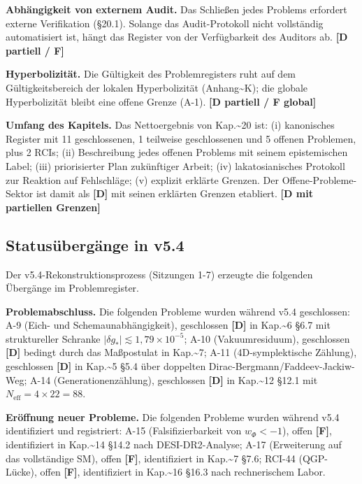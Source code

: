 ﻿\documentclass[11pt,letterpaper]{article}
\begin{document}
\textbf{Abhängigkeit von externem Audit.} Das Schließen jedes Problems erfordert externe Verifikation (§20.1). Solange das Audit-Protokoll nicht vollständig automatisiert ist, hängt das Register von der Verfügbarkeit des Auditors ab. \textbf{[D partiell / F]}

\textbf{Hyperbolizität.} Die Gültigkeit des Problemregisters ruht auf dem Gültigkeitsbereich der lokalen Hyperbolizität (Anhang\textasciitilde{}K); die globale Hyperbolizität bleibt eine offene Grenze (A-1). \textbf{[D partiell / F global]}

\textbf{Umfang des Kapitels.} Das Nettoergebnis von Kap.\textasciitilde{}20 ist: (i) kanonisches Register mit 11 geschlossenen, 1 teilweise geschlossenen und 5 offenen Problemen, plus 2 RCIs; (ii) Beschreibung jedes offenen Problems mit seinem epistemischen Label; (iii) priorisierter Plan zukünftiger Arbeit; (iv) lakatosianisches Protokoll zur Reaktion auf Fehlschläge; (v) explizit erklärte Grenzen. Der Offene-Probleme-Sektor ist damit als \textbf{[D]} mit seinen erklärten Grenzen etabliert. \textbf{[D mit partiellen Grenzen]}
\subsection{Statusübergänge in v5.4}
Der v5.4-Rekonstruktionsprozess (Sitzungen 1-7) erzeugte die folgenden Übergänge im Problemregister.

\textbf{Problemabschluss.} Die folgenden Probleme wurden während v5.4 geschlossen: A-9 (Eich- und Schemaunabhängigkeit), geschlossen \textbf{[D]} in Kap.\textasciitilde{}6 §6.7 mit struktureller Schranke $|\delta g_*| \lesssim 1{,}79 \times 10^{-5}$; A-10 (Vakuumresiduum), geschlossen \textbf{[D]} bedingt durch das Maßpostulat in Kap.\textasciitilde{}7; A-11 (4D-symplektische Zählung), geschlossen \textbf{[D]} in Kap.\textasciitilde{}5 §5.4 über doppelten Dirac-Bergmann/Faddeev-Jackiw-Weg; A-14 (Generationenzählung), geschlossen \textbf{[D]} in Kap.\textasciitilde{}12 §12.1 mit $N_{\text{eff}} = 4 \times 22 = 88$.

\textbf{Eröffnung neuer Probleme.} Die folgenden Probleme wurden während v5.4 identifiziert und registriert: A-15 (Falsifizierbarkeit von $w_\Phi < -1$), offen \textbf{[F]}, identifiziert in Kap.\textasciitilde{}14 §14.2 nach DESI-DR2-Analyse; A-17 (Erweiterung auf das vollständige SM), offen \textbf{[F]}, identifiziert in Kap.\textasciitilde{}7 §7.6; RCI-44 (QGP-Lücke), offen \textbf{[F]}, identifiziert in Kap.\textasciitilde{}16 §16.3 nach rechnerischem Labor.
\end{document}
